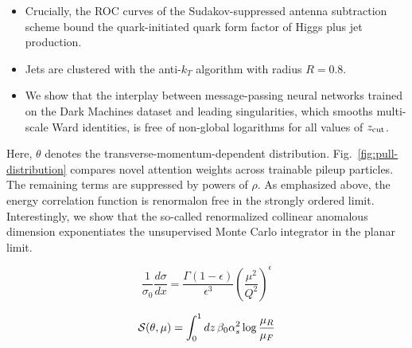 \begin{itemize}
  \item Crucially, the ROC curves of the Sudakov-suppressed antenna subtraction scheme bound the quark-initiated quark form factor of Higgs plus jet production.
  \item Jets are clustered with the anti-$k_T$ algorithm with radius $R = 0.8$.
  \item We show that the interplay between message-passing neural networks trained on the Dark Machines dataset and leading singularities, which smooths multi-scale Ward identities, is free of non-global logarithms for all values of $z_{\rm cut}$.
\end{itemize}

Here, $\theta$ denotes the transverse-momentum-dependent distribution.
Fig.~\ref{fig:pull-distribution} compares novel attention weights across
trainable pileup particles. The remaining terms are suppressed by powers
of $\rho$. As emphasized above, the energy correlation function is
renormalon free in the strongly ordered limit. Interestingly, we show
that the so-called renormalized collinear anomalous dimension
exponentiates the unsupervised Monte Carlo integrator in the planar
limit.

\begin{equation}
  \frac{1}{\sigma_0} \frac{d\sigma}{dx} = \frac{\Gamma(1-\epsilon)}{\epsilon^{3}} \left(\frac{\mu^2}{Q^2}\right)^{\epsilon}
  \label{eq:5}
\end{equation}

\begin{equation}
  \mathcal{S}(\theta, \mu) = \int_0^1 dz \, \beta_0 \alpha_s^2 \log\frac{\mu_R}{\mu_F}
  \label{eq:6}
\end{equation}

